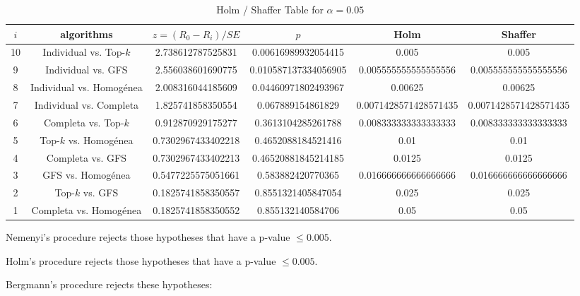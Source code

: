 \documentclass[a4paper,10pt]{article}
\begin{document}
\begin{landscape}
\begin{table}[!htp]
\centering\tiny
\caption{Holm / Shaffer Table for $\alpha=0.05$}
\begin{tabular}{cccccc}
$i$&algorithms&$z=(R_0 - R_i)/SE$&$p$&Holm&Shaffer\\
\hline
10&Individual vs. Top-$k$&2.738612787525831&0.00616989932054415&0.005&0.005\\
9&Individual vs. GFS&2.556038601690775&0.010587137334056905&0.005555555555555556&0.005555555555555556\\
8&Individual vs. Homogénea&2.008316044185609&0.04460971802493967&0.00625&0.00625\\
7&Individual vs. Completa&1.825741858350554&0.067889154861829&0.0071428571428571435&0.0071428571428571435\\
6&Completa vs. Top-$k$&0.912870929175277&0.3613104285261788&0.008333333333333333&0.008333333333333333\\
5&Top-$k$ vs. Homogénea&0.7302967433402218&0.4652088184521416&0.01&0.01\\
4&Completa vs. GFS&0.7302967433402213&0.46520881845214185&0.0125&0.0125\\
3&GFS vs. Homogénea&0.5477225575051661&0.583882420770365&0.016666666666666666&0.016666666666666666\\
2&Top-$k$ vs. GFS&0.1825741858350557&0.8551321405847054&0.025&0.025\\
1&Completa vs. Homogénea&0.1825741858350552&0.855132140584706&0.05&0.05\\
\hline
\end{tabular}
\end{table}
Nemenyi's procedure rejects those hypotheses that have a p-value $\le0.005$.


Holm's procedure rejects those hypotheses that have a p-value $\le0.005$.


Bergmann's procedure rejects these hypotheses:


\begin{itemize}


\end{itemize}



\end{landscape}
\end{document}
